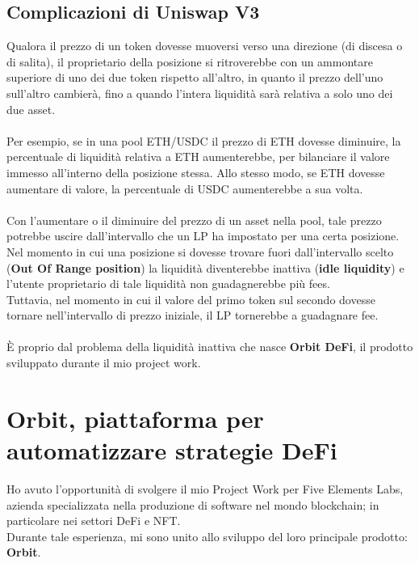 \documentclass[12pt,a4paper]{report}
\begin{document}
\section{Complicazioni di Uniswap V3}

Qualora il prezzo di un token dovesse muoversi verso una direzione (di discesa o di salita), il proprietario della posizione si ritroverebbe con un ammontare superiore di uno dei due token rispetto all'altro, in quanto il prezzo dell'uno sull'altro cambierà, fino a quando l'intera liquidità sarà relativa a solo uno dei due asset.
\\\\Per esempio, se in una pool ETH/USDC il prezzo di ETH dovesse diminuire, la percentuale di liquidità relativa a ETH aumenterebbe, per bilanciare il valore immesso all'interno della posizione stessa.
Allo stesso modo, se ETH dovesse aumentare di valore, la percentuale di USDC aumenterebbe a sua volta.
\\\\Con l'aumentare o il diminuire del prezzo di un asset nella pool, tale prezzo potrebbe uscire dall'intervallo che un LP ha impostato per una certa posizione. Nel momento in cui una posizione si dovesse trovare fuori dall'intervallo scelto (\textbf{Out Of Range position}) la liquidità diventerebbe inattiva (\textbf{idle liquidity}) e l'utente proprietario di tale liquidità non guadagnerebbe più fees.
\\Tuttavia, nel momento in cui il valore del primo token sul secondo dovesse tornare nell'intervallo di prezzo iniziale, il LP tornerebbe a guadagnare fee.
\\\\È proprio dal problema della liquidità inattiva che nasce \textbf{Orbit DeFi}, il prodotto sviluppato durante il mio project work.







\chapter{Orbit, piattaforma per automatizzare strategie DeFi}

Ho avuto l'opportunità di svolgere il mio Project Work per Five Elements Labs, azienda specializzata nella produzione di software nel mondo blockchain; in particolare nei settori DeFi e NFT.
\\Durante tale esperienza, mi sono unito allo sviluppo del loro principale prodotto: \textbf{Orbit}\cite{orbit_website}.
\end{document}
